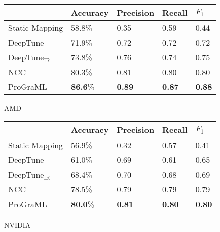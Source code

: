 \centering
\footnotesize
\renewcommand{\arraystretch}{1.6}
\begin{subfigure}{.48\linewidth}
\begin{tabular}{l llll}
  \toprule
   & Accuracy & Precision & Recall & $F_1$\\
  \midrule
  Static Mapping                 & 58.8\% & 0.35 & 0.59 & 0.44\\
  DeepTune~\cite{Cummins2017b}   & 71.9\% & 0.72 & 0.72 & 0.72\\
  DeepTune$_{\text{IR}}$         & 73.8\% & 0.76 & 0.74 & 0.75\\
  NCC~\cite{Ben-nun2018}    & 80.3\% & 0.81 & 0.80 & 0.80\\
  ProGraML                       & \textbf{86.6}\% & \textbf{0.89} & \textbf{0.87} & \textbf{0.88}\\
  \midrule
\end{tabular}
\caption{AMD}
\end{subfigure}
\begin{subfigure}{.48\linewidth}
\begin{tabular}{l llll}
  \toprule
   & Accuracy & Precision & Recall & $F_1$\\
  \midrule
  Static Mapping                 & 56.9\%    & 0.32 & 0.57 & 0.41\\
  DeepTune~\cite{Cummins2017b}   & 61.0\%    & 0.69 & 0.61 & 0.65\\
  DeepTune$_{\text{IR}}$         & 68.4\% & 0.70 & 0.68 & 0.69\\
  NCC~\cite{Ben-nun2018}    & 78.5\%   & 0.79 & 0.79 & 0.79\\
  ProGraML                       & \textbf{80.0}\% & \textbf{0.81} & \textbf{0.80} & \textbf{0.80}\\
  \midrule
\end{tabular}
\caption{NVIDIA}
\end{subfigure}
